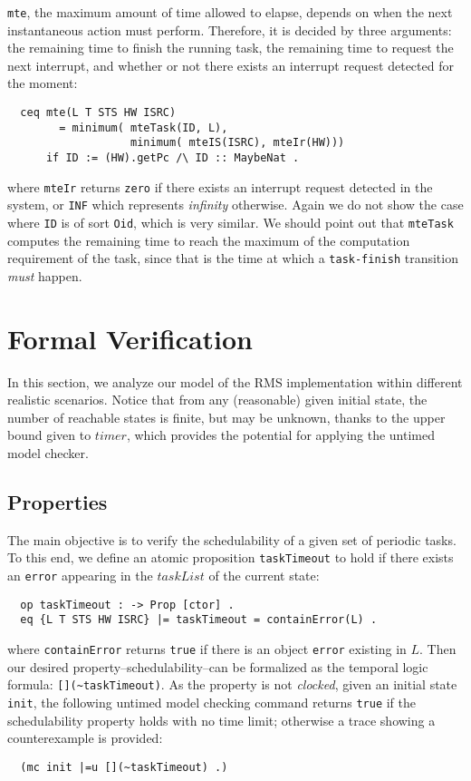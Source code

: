 \documentclass{llncs}
\begin{document}
\verb|mte|, the maximum amount of time allowed to elapse, depends on
when the next instantaneous action must perform. Therefore, it is
decided by three arguments: the remaining time to finish the running
task, the remaining time to request the next interrupt, and whether or
not there exists an interrupt request detected for the moment:
\begin{verbatim}
  ceq mte(L T STS HW ISRC)
        = minimum( mteTask(ID, L),
                   minimum( mteIS(ISRC), mteIr(HW)))
      if ID := (HW).getPc /\ ID :: MaybeNat .
\end{verbatim}
where \verb|mteIr| returns \verb|zero| if there exists an interrupt
request detected in the system, or \verb|INF| which represents
\emph{infinity} otherwise. Again we do not show the case where
\verb|ID| is of sort \verb|Oid|, which is very similar. We should
point out that \verb|mteTask| computes the remaining time to reach the
maximum of the computation requirement of the task, since that is the
time at which a \verb|task-finish| transition \emph{must} happen.

\section{Formal Verification}
\label{s:verification}
In this section, we analyze our model of the RMS implementation within
different realistic scenarios.  Notice that from any (reasonable)
given initial state, the number of reachable states is finite, but may
be unknown, thanks to the upper bound given to $timer$, which provides
the potential for applying the untimed model checker.

\subsection{Properties}
The main objective is to verify the schedulability of a given set of
periodic tasks. To this end, we define an atomic proposition
\verb|taskTimeout| to hold if there exists an \verb|error| appearing
in the $taskList$ of the current state:
\begin{verbatim}
  op taskTimeout : -> Prop [ctor] .
  eq {L T STS HW ISRC} |= taskTimeout = containError(L) .
\end{verbatim}
where \verb|containError| returns \verb|true| if there is an object
\verb|error| existing in $L$. Then our desired
property--schedulability--can be formalized as the temporal logic
formula: \verb|[](~taskTimeout)|. As the property is not
\emph{clocked}, given an initial state \verb|init|, the following
untimed model checking command returns \verb|true| if the
schedulability property holds with no time limit; otherwise a trace
showing a counterexample is provided:
\begin{verbatim}
  (mc init |=u [](~taskTimeout) .)
\end{verbatim}
\end{document}
